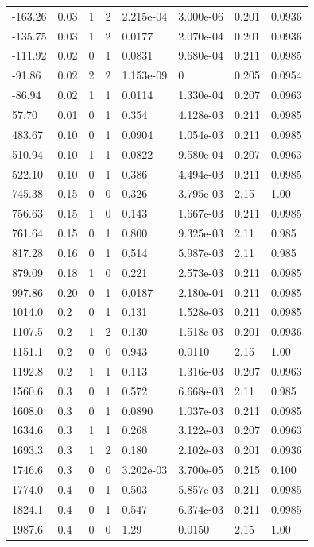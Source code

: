 \documentclass[preview]{standalone}
\begin{document}
{{\begin{tabular}{L{1.2cm}C{1.2cm} C{0.3cm}C{0.5cm} C{1.4cm}C{1.4cm} C{1.4cm}C{1.4cm}}
  -163.26  &  0.03  & 1     &  2 &  2.215e-04  & 3.000e-06  & 0.201 &  0.0936   \\ 
  -135.75  &  0.03  & 1     &  2 &  0.0177  & 2.070e-04  & 0.201 &  0.0936   \\ 
  -111.92  &  0.02  & 0     &  1 &  0.0831  & 9.680e-04  & 0.211 &  0.0985   \\ 
  -91.86  &  0.02  & 2     &  2 &  1.153e-09  & 0  & 0.205 &  0.0954   \\ 
  -86.94  &  0.02  & 1     &  1 &  0.0114  & 1.330e-04  & 0.207 &  0.0963   \\ 
  57.70  &  0.01  & 0     &  1 &  0.354  & 4.128e-03  & 0.211 &  0.0985   \\ 
  483.67  &  0.10  & 0     &  1 &  0.0904  & 1.054e-03  & 0.211 &  0.0985   \\ 
  510.94  &  0.10  & 1     &  1 &  0.0822  & 9.580e-04  & 0.207 &  0.0963   \\ 
  522.10  &  0.10  & 0     &  1 &  0.386  & 4.494e-03  & 0.211 &  0.0985   \\ 
  745.38  &  0.15  & 0     &  0 &  0.326  & 3.795e-03  & 2.15 &  1.00   \\ 
  756.63  &  0.15  & 1     &  0 &  0.143  & 1.667e-03  & 0.211 &  0.0985   \\ 
  761.64  &  0.15  & 0     &  1 &  0.800  & 9.325e-03  & 2.11 &  0.985   \\ 
  817.28  &  0.16  & 0     &  1 &  0.514  & 5.987e-03  & 2.11 &  0.985   \\ 
  879.09  &  0.18  & 1     &  0 &  0.221  & 2.573e-03  & 0.211 &  0.0985   \\ 
  997.86  &  0.20  & 0     &  1 &  0.0187  & 2.180e-04  & 0.211 &  0.0985   \\ 
  1014.0  &   0.2  & 0     &  1 &  0.131  & 1.528e-03  & 0.211 &  0.0985   \\ 
  1107.5  &   0.2  & 1     &  2 &  0.130  & 1.518e-03  & 0.201 &  0.0936   \\ 
  1151.1  &   0.2  & 0     &  0 &  0.943  & 0.0110  & 2.15 &  1.00   \\ 
  1192.8  &   0.2  & 1     &  1 &  0.113  & 1.316e-03  & 0.207 &  0.0963   \\ 
  1560.6  &   0.3  & 0     &  1 &  0.572  & 6.668e-03  & 2.11 &  0.985   \\ 
  1608.0  &   0.3  & 0     &  1 &  0.0890  & 1.037e-03  & 0.211 &  0.0985   \\ 
  1634.6  &   0.3  & 1     &  1 &  0.268  & 3.122e-03  & 0.207 &  0.0963   \\ 
  1693.3  &   0.3  & 1     &  2 &  0.180  & 2.102e-03  & 0.201 &  0.0936   \\ 
  1746.6  &   0.3  & 0     &  0 &  3.202e-03  & 3.700e-05  & 0.215 &  0.100   \\ 
  1774.0  &   0.4  & 0     &  1 &  0.503  & 5.857e-03  & 0.211 &  0.0985   \\ 
  1824.1  &   0.4  & 0     &  1 &  0.547  & 6.374e-03  & 0.211 &  0.0985   \\ 
  1987.6  &   0.4  & 0     &  0 &  1.29  & 0.0150  & 2.15 &  1.00   \\ 
\hline 
\end{tabular} 

}}
\end{document}
